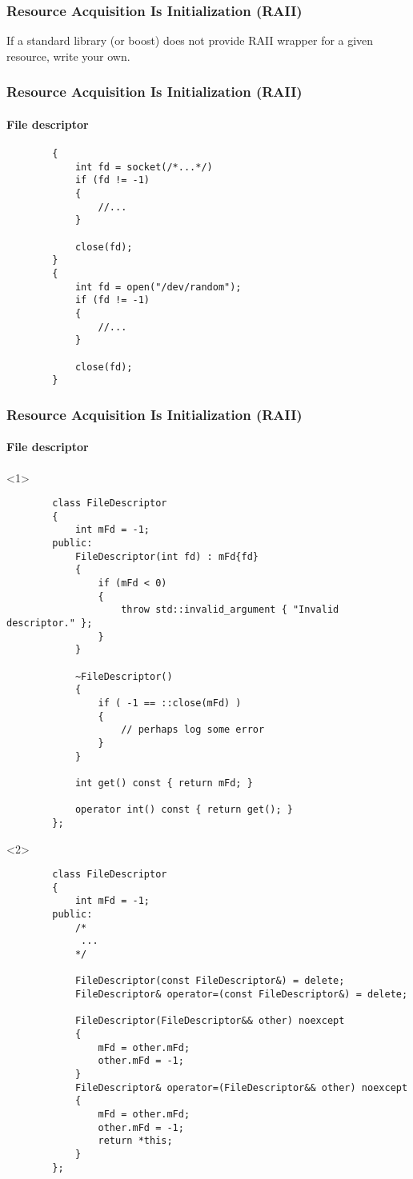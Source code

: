 \documentclass{beamer}
\begin{document}
\begin{frame}
\frametitle{Resource Acquisition Is Initialization (RAII)}
    \begin{center}
        If a standard library (or boost) does not provide RAII wrapper for a given resource, write your own.       
    \end{center}
\end{frame}

\begin{frame}[fragile,t]
\frametitle{Resource Acquisition Is Initialization (RAII)}
\framesubtitle{File descriptor}
    \begin{lstlisting}
        {
            int fd = socket(/*...*/)
            if (fd != -1)
            {
                //...
            }

            close(fd);
        }
        {
            int fd = open("/dev/random");
            if (fd != -1)
            {
                //...
            }

            close(fd);
        }
    \end{lstlisting}
\end{frame}

\begin{frame}[fragile,t]
\frametitle{Resource Acquisition Is Initialization (RAII)}
\framesubtitle{File descriptor}
    \begin{onlyenv}<1>
    \begin{lstlisting}
        class FileDescriptor
        {
            int mFd = -1;
        public:
            FileDescriptor(int fd) : mFd{fd}
            {
                if (mFd < 0)
                {
                    throw std::invalid_argument { "Invalid descriptor." };
                }
            }

            ~FileDescriptor()
            {
                if ( -1 == ::close(mFd) )
                {
                    // perhaps log some error
                }  
            }

            int get() const { return mFd; }

            operator int() const { return get(); }
        };
    \end{lstlisting}
    \end{onlyenv}
    
    \begin{onlyenv}<2>
    \begin{lstlisting}
        class FileDescriptor
        {
            int mFd = -1;
        public:
            /*
             ...
            */

            FileDescriptor(const FileDescriptor&) = delete;
            FileDescriptor& operator=(const FileDescriptor&) = delete;

            FileDescriptor(FileDescriptor&& other) noexcept
            {
                mFd = other.mFd;
                other.mFd = -1;
            }
            FileDescriptor& operator=(FileDescriptor&& other) noexcept
            {
                mFd = other.mFd;
                other.mFd = -1;
                return *this;
            }
        };
    \end{lstlisting}
    \end{onlyenv}
\end{frame}
\end{document}
